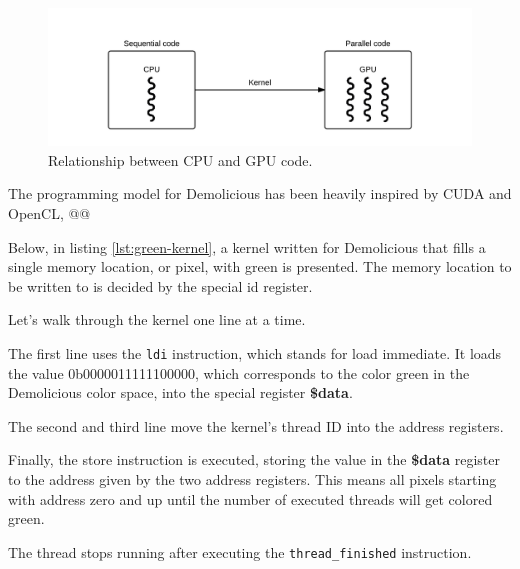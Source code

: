 \documentclass[../main/report.tex]{subfiles}
\begin{document}
\begin{figure}[H]
	\centering
	\includegraphics[width=\textwidth]{../system_overview/diagrams/programming_model_cpu_gpu.png}
	\caption{Relationship between CPU and GPU code.}
	\label{fig:programming_model_cpu_gpu}
\end{figure}

The programming model for Demolicious has been heavily inspired by CUDA and OpenCL, 
@@





Below, in listing \ref{lst:green-kernel}, 
a kernel written for Demolicious that fills a single memory location,
or pixel, with green is presented.
The memory location to be written to is decided by the special id register.



Let's walk through the kernel one line at a time.

The first line uses the \verb/ldi/ instruction, which stands for load immediate.
It loads the value 0b0000011111100000,
which corresponds to the color green in the Demolicious color space,
into the special register \textbf{\$data}.

The second and third line move the kernel's thread ID into the address registers.


Finally, the store instruction is executed, storing the value in the \textbf{\$data} register
to the address given by the two address registers.
This means all pixels starting with address zero and up until the number of executed threads
will get colored green.

The thread stops running after executing the \verb/thread_finished/ instruction.
\\

\end{document}
